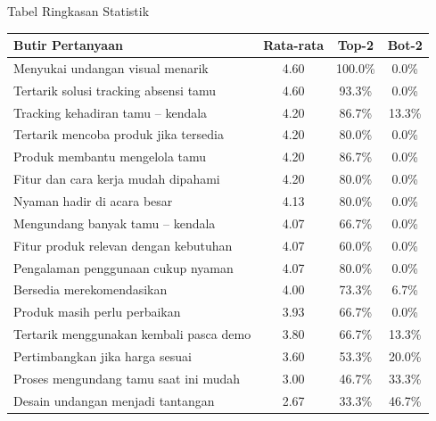 \documentclass[aspectratio=169]{beamer}
\begin{document}
\begin{frame}{Tabel Ringkasan Statistik}
\centering
\footnotesize
\setlength{\tabcolsep}{4pt}
\begin{tabular}{@{}lccc@{}}
\toprule
\textbf{Butir Pertanyaan} & \textbf{Rata-rata} & \textbf{Top-2} & \textbf{Bot-2} \\
\midrule
Menyukai undangan visual menarik        & 4.60 & \textcolor{success}{100.0\%} & 0.0\% \\
Tertarik solusi tracking absensi tamu   & 4.60 & \textcolor{success}{93.3\%}  & 0.0\% \\
Tracking kehadiran tamu -- kendala      & 4.20 & \textcolor{success}{86.7\%}  & 13.3\% \\
Tertarik mencoba produk jika tersedia   & 4.20 & 80.0\% & 0.0\% \\
Produk membantu mengelola tamu          & 4.20 & \textcolor{success}{86.7\%}  & 0.0\% \\
Fitur dan cara kerja mudah dipahami     & 4.20 & 80.0\% & 0.0\% \\
Nyaman hadir di acara besar             & 4.13 & 80.0\% & 0.0\% \\
Mengundang banyak tamu -- kendala       & 4.07 & 66.7\% & 0.0\% \\
Fitur produk relevan dengan kebutuhan   & 4.07 & 60.0\% & 0.0\% \\
Pengalaman penggunaan cukup nyaman      & 4.07 & 80.0\% & 0.0\% \\
Bersedia merekomendasikan               & 4.00 & 73.3\% & 6.7\% \\
Produk masih perlu perbaikan            & 3.93 & 66.7\% & 0.0\% \\
Tertarik menggunakan kembali pasca demo & 3.80 & 66.7\% & 13.3\% \\
Pertimbangkan jika harga sesuai         & 3.60 & 53.3\% & \textcolor{danger}{20.0\%} \\
Proses mengundang tamu saat ini mudah   & 3.00 & 46.7\% & \textcolor{danger}{33.3\%} \\
Desain undangan menjadi tantangan       & 2.67 & 33.3\% & \textcolor{danger}{46.7\%} \\
\bottomrule
\end{tabular}
\end{frame}
\end{document}
